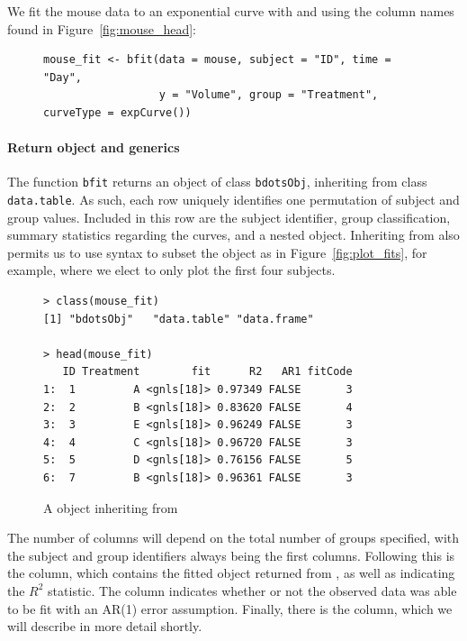 We fit the mouse data to an exponential curve with  and using the column names found in Figure~\ref{fig:mouse_head}:

\begin{singlespace}
\begin{figure}[H]
\centering
\begin{BVerbatim}
mouse_fit <- bfit(data = mouse, subject = "ID", time = "Day", 
                  y = "Volume", group = "Treatment", curveType = expCurve())
\end{BVerbatim}
\label{fig:bfit_example}
\end{figure}
\end{singlespace}


\paragraph{Return object and generics}


The function \texttt{bfit} returns an object of class \texttt{bdotsObj}, inheriting from class \texttt{data.table}. As such, each row uniquely identifies one permutation of subject and group values. Included in this row are the subject identifier, group classification, summary statistics regarding the curves, and a nested  object. Inheriting from  also permits us to use  syntax to subset the object as in Figure~\ref{fig:plot_fits}, for example, where we elect to only plot the first four subjects.

\begin{singlespace}
\begin{figure}[H]
\centering
\begin{BVerbatim}
> class(mouse_fit)
[1] "bdotsObj"   "data.table" "data.frame"

> head(mouse_fit)
   ID Treatment        fit      R2   AR1 fitCode
1:  1         A <gnls[18]> 0.97349 FALSE       3
2:  2         B <gnls[18]> 0.83620 FALSE       4
3:  3         E <gnls[18]> 0.96249 FALSE       3
4:  4         C <gnls[18]> 0.96720 FALSE       3
5:  5         D <gnls[18]> 0.76156 FALSE       5
6:  7         B <gnls[18]> 0.96361 FALSE       3
\end{BVerbatim}
\caption{A  object inheriting from }
\label{fig:bdotsObj}
\end{figure}
\end{singlespace}

The number of columns will depend on the total number of groups specified, with the subject and group identifiers always being the first columns. Following this is the  column, which contains the fitted object returned from , as well as  indicating the $R^2$ statistic. The  column indicates whether or not the observed data was able to be fit with an AR(1) error assumption. Finally, there is the  column, which we will describe in more detail shortly.


